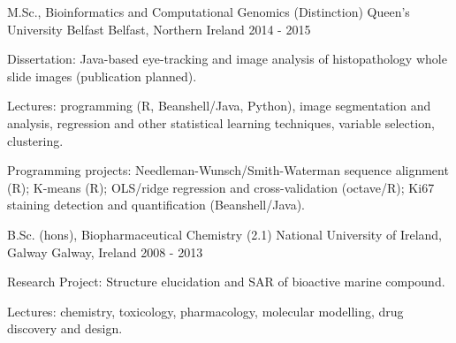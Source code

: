 


\begin{cventries}


\cventry
{M.Sc., Bioinformatics and Computational Genomics (Distinction)} %
{Queen's University Belfast} %
{Belfast, Northern Ireland} %
{2014 - 2015} %
{ %
\begin{cvitems}
\item {Dissertation: Java-based eye-tracking and image analysis of histopathology whole slide images (publication planned).}
\item {Lectures: programming (R, Beanshell/Java, Python), 
image segmentation and analysis, regression and other 
statistical learning techniques, variable selection, clustering.}
\item {Programming projects: Needleman-Wunsch/Smith-Waterman sequence alignment (R); K-means (R); OLS/ridge regression and cross-validation (octave/R); Ki67 staining detection and quantification (Beanshell/Java).}
\end{cvitems}
}
\cventry
{B.Sc. (hons), Biopharmaceutical Chemistry (2.1)} %
{National University of Ireland, Galway} %
{Galway, Ireland} %
{2008 - 2013} %
{ %
\begin{cvitems}
\item {Research Project: Structure elucidation and SAR of bioactive marine compound.}
\item {Lectures: chemistry, toxicology, pharmacology, molecular modelling,
drug discovery and design.}
\end{cvitems}
}



\end{cventries}

